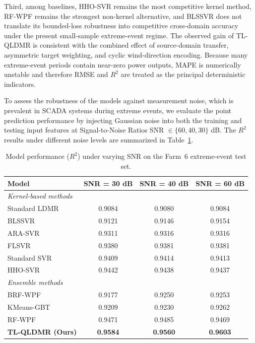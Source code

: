Third, among baselines, HHO-SVR remains the most competitive kernel method, RF-WPF remains the strongest non-kernel alternative, and BLSSVR does not translate its bounded-loss robustness into competitive cross-domain accuracy under the present small-sample extreme-event regime. The observed gain of TL-QLDMR is consistent with the combined effect of source-domain transfer, asymmetric target weighting, and cyclic wind-direction encoding. Because many extreme-event periods contain near-zero power outputs, MAPE is numerically unstable and therefore RMSE and $R^2$ are treated as the principal deterministic indicators.

To assess the robustness of the models against measurement noise, which is prevalent in SCADA systems during extreme events, we evaluate the point prediction performance by injecting Gaussian noise into both the training and testing input features at Signal-to-Noise Ratios SNR $\in \{60, 40, 30\}$ dB. 
The $R^2$ results under different noise levels are summarized in Table~\ref{tab:exp2_noise}.

\begin{table}[ht]
\centering
\caption{Model performance ($R^2$) under varying SNR on the Farm~6 extreme-event test set.}
\setlength{\tabcolsep}{3.5mm}
\begin{tabular}{lccc}
\toprule
Model & SNR = 30 dB & SNR = 40 dB & SNR = 60 dB \\
\midrule
\multicolumn{4}{l}{\textit{Kernel-based methods}} \\
Standard LDMR & 0.9084 & 0.9080 & 0.9084 \\
BLSSVR        & 0.9121 & 0.9146 & 0.9154 \\
ARA-SVR       & 0.9311 & 0.9316 & 0.9316 \\
FLSVR         & 0.9380 & 0.9381 & 0.9381 \\
Standard SVR  & 0.9409 & 0.9414 & 0.9413 \\
HHO-SVR       & 0.9442 & 0.9438 & 0.9437 \\
\midrule
\multicolumn{4}{l}{\textit{Ensemble methods}} \\
BRF-WPF       & 0.9177 & 0.9250 & 0.9253 \\
KMeans-GBT    & 0.9209 & 0.9230 & 0.9262 \\
RF-WPF        & 0.9471 & 0.9485 & 0.9469 \\
\midrule
\textbf{TL-QLDMR (Ours)} & \textbf{0.9584} & \textbf{0.9560} & \textbf{0.9603} \\
\bottomrule
\end{tabular}
\label{tab:exp2_noise}
\end{table}


